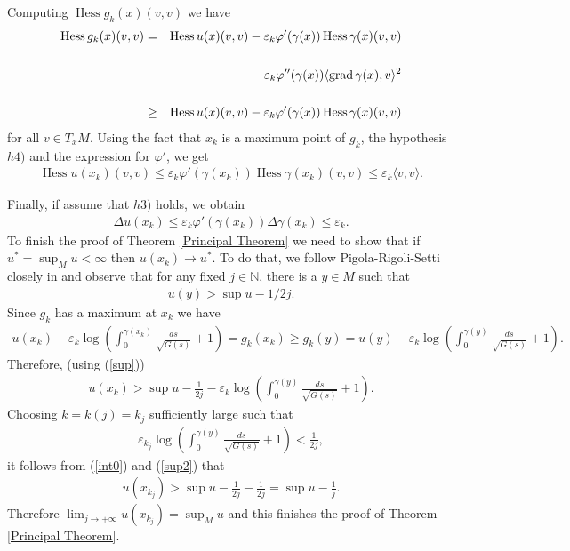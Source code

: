 \documentclass[a4paper]{amsart}
\begin{document}
Computing $\operatorname{Hess} g_{k}(x)(v,v)$ we have
\begin{eqnarray}
\operatorname{Hess} g_{k}(x)(v,v) &=& \operatorname{Hess} u(x) (v,v) - \varepsilon_{k}\varphi'(\gamma(x))\operatorname{Hess} \gamma(x) (v,v) \nonumber \\
 && \nonumber \\ && -  \varepsilon_{k}\varphi''(\gamma(x))\langle {{{\rm{grad}\,}}} \gamma(x),v \rangle^2   \\
 &&\nonumber\\
&\geq & \operatorname{Hess} u(x) (v,v) - \varepsilon_{k}\varphi'(\gamma(x))\operatorname{Hess} \gamma(x) (v,v) \nonumber
\end{eqnarray}
for all $ v\in T_{x}M $. Using the fact that $x_{k}$ is a maximum point of $g_{k}$, the hypothesis $h4)$ and the expression for $\varphi'$, we get
\begin{eqnarray}
\operatorname{Hess} u(x_k) (v,v) \leq \varepsilon_{k}\varphi'(\gamma(x_k))\operatorname{Hess} \gamma(x_k) (v,v) \leq \varepsilon_{k}\langle v,v\rangle .
\end{eqnarray}

Finally, if assume that $h3)$ holds, we obtain
\begin{eqnarray*}
\Delta u(x_k) \leq \varepsilon_{k}\varphi'(\gamma(x_k))\Delta \gamma(x_k) \leq \varepsilon_{k}.
\end{eqnarray*}
To finish the proof of Theorem \ref{Principal Theorem} we need to show that if $u^{\ast}=\sup_{M}u<\infty$ then $u(x_{k})\to u^{\ast}$. To do that, we follow Pigola-Rigoli-Setti  closely in \cite{prs-memoirs} and observe that for any fixed $ j \in \mathbb{N} $, there is a  $ y \in M $ such that
\begin{eqnarray}\label{sup}
u(y) > \sup u - 1/2j .
\end{eqnarray}
Since $ g_k $ has a maximum at $ x_k $ we have
\begin{eqnarray*}
u(x_k) - \varepsilon_{k}\log \left(\int_{0}^{\gamma(x_k)}\frac{ds}{\sqrt{G(s)}}+1\right) = g_{k}(x_k) \geq g_{k}(y) = u(y) - \varepsilon_{k}\log \left(\int_{0}^{\gamma(y)}\frac{ds}{\sqrt{G(s)}}+1\right).
\end{eqnarray*}
Therefore, (using (\ref{sup}))
\begin{eqnarray}\label{int0}
u(x_k) > \sup u - \frac{1}{2j} - \varepsilon_{k}\log \left(\int_{0}^{\gamma(y)}\frac{ds}{\sqrt{G(s)}}+1\right).
\end{eqnarray}
Choosing  $k=k(j)=k_{j}$ sufficiently large  such that
\begin{eqnarray}\label{sup2}
\varepsilon_{k_{j}}\log \left(\int_{0}^{\gamma(y)}\frac{ds}{\sqrt{G(s)}}+1\right) < \frac{1}{2j},
\end{eqnarray}
it follows from  ({\ref{int0}}) and ({\ref{sup2}})  that
\begin{eqnarray}\label{int}
u(x_{k_j}) > \sup u - \frac{1}{2j} - \frac{1}{2j} = \sup u - \frac{1}{j}.
\end{eqnarray}
Therefore $\displaystyle\lim_{j \rightarrow +\infty} u(x_{k_j}) = \sup_{M} u $ and this finishes the proof of Theorem \ref{Principal Theorem}.
\end{document}
